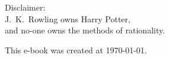 \newpage
\vspace*{4cm}
\begin{center}
Disclaimer:\\J.~K.~Rowling owns Harry Potter,\\and no-one owns the methods of rationality.
\end{center}

\vfill
This e-book was created at \today{}.
